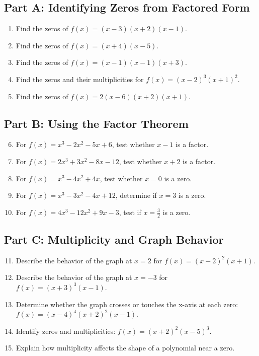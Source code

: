 \documentclass[14pt]{extarticle}
\begin{document}
\subsection*{Part A: Identifying Zeros from Factored Form}
\begin{enumerate}
  \item Find the zeros of \(f(x) = (x - 3)(x + 2)(x - 1)\).
  \item Find the zeros of \(f(x) = (x + 4)(x - 5)\).
  \item Find the zeros of \(f(x) = (x - 1)(x - 1)(x + 3)\).
  \item Find the zeros and their multiplicities for \(f(x) = (x - 2)^3(x + 1)^2\).
  \item Find the zeros of \(f(x) = 2(x - 6)(x + 2)(x + 1)\).
\end{enumerate}

\subsection*{Part B: Using the Factor Theorem}
\begin{enumerate}
  \setcounter{enumi}{5}
  \item For \(f(x) = x^3 - 2x^2 - 5x + 6\), test whether \(x - 1\) is a factor.
  \item For \(f(x) = 2x^3 + 3x^2 - 8x - 12\), test whether \(x + 2\) is a factor.
  \item For \(f(x) = x^3 - 4x^2 + 4x\), test whether \(x = 0\) is a zero.
  \item For \(f(x) = x^3 - 3x^2 - 4x + 12\), determine if \(x = 3\) is a zero.
  \item For \(f(x) = 4x^3 - 12x^2 + 9x - 3\), test if \(x = \tfrac{3}{2}\) is a zero.
\end{enumerate}

\subsection*{Part C: Multiplicity and Graph Behavior}
\begin{enumerate}
  \setcounter{enumi}{10}
  \item Describe the behavior of the graph at \(x = 2\) for \(f(x) = (x - 2)^2(x + 1)\).
  \item Describe the behavior of the graph at \(x = -3\) for \(f(x) = (x + 3)^3(x - 1)\).
  \item Determine whether the graph crosses or touches the x-axis at each zero: \(f(x) = (x - 4)^4(x + 2)^2(x - 1)\).
  \item Identify zeros and multiplicities: \(f(x) = (x + 2)^2(x - 5)^3\).
  \item Explain how multiplicity affects the shape of a polynomial near a zero.
\end{enumerate}
\end{document}
